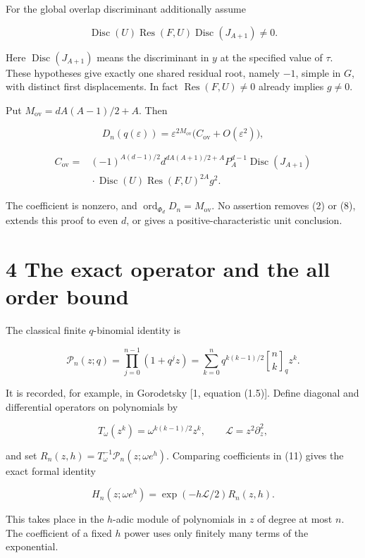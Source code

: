 \documentclass[
  11pt,
]{article}
\begin{document}
For the global overlap discriminant additionally assume

\[
\operatorname{Disc}(U)\operatorname{Res}(F,U)
\operatorname{Disc}(J_{A+1})\ne 0. \tag{8}
\]

Here \(\operatorname{Disc}(J_{A+1})\) means the discriminant in \(y\) at
the specified value of \(\tau\). These hypotheses give exactly one
shared residual root, namely \(-1\), simple in \(G\), with distinct
first displacements. In fact \(\operatorname{Res}(F,U)\ne0\) already
implies \(g\ne0\).

Put \(M_{\mathrm{ov}}=dA(A-1)/2+A\). Then

\[
D_n(q(\varepsilon))=
\varepsilon^{2M_{\mathrm{ov}}}
\bigl(C_{\mathrm{ov}}+O(\varepsilon^2)\bigr), \tag{9}
\]

\[
\begin{aligned}
C_{\mathrm{ov}}={}&(-1)^{A(d-1)/2}
 d^{dA(A+1)/2+A}P_A^{d-1}\operatorname{Disc}(J_{A+1})\\
&\mathrel{}\cdot\operatorname{Disc}(U)
\operatorname{Res}(F,U)^{2A}g^2.
\end{aligned} \tag{10}
\]

The coefficient is nonzero, and
\(\operatorname{ord}_{\Phi_d}D_n=M_{\mathrm{ov}}\). No assertion removes
(2) or (8), extends this proof to even \(d\), or gives a
positive-characteristic unit conclusion.

\section{4 The exact operator and the all order
bound}\label{the-exact-operator-and-the-all-order-bound}

The classical finite \(q\)-binomial identity is

\[
\mathcal P_n(z;q)=\prod_{j=0}^{n-1}(1+q^jz)
=\sum_{k=0}^{n}q^{k(k-1)/2}\genfrac{[}{]}{0pt}{}{n}{k}_qz^k. \tag{11}
\]

It is recorded, for example, in Gorodetsky {[}1, equation (1.5){]}.
Define diagonal and differential operators on polynomials by

\[
T_\omega(z^k)=\omega^{k(k-1)/2}z^k,
\qquad \mathcal L=z^2\partial_z^2,
\]

and set \(R_n(z,h)=T_\omega^{-1}\mathcal P_n(z;\omega e^h)\). Comparing
coefficients in (11) gives the exact formal identity

\[
H_n(z;\omega e^h)=\exp(-h\mathcal L/2)R_n(z,h). \tag{12}
\]

This takes place in the \(h\)-adic module of polynomials in \(z\) of
degree at most \(n\). The coefficient of a fixed \(h\) power uses only
finitely many terms of the exponential.
\end{document}
